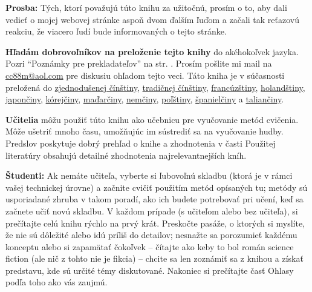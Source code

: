 \cleardoublepage
\pagestyle{fancy}
\fancyhf{}
\fancyfoot[LE,RO]{\thepage}
\renewcommand{\headrulewidth}{0pt}
\renewcommand{\footrulewidth}{0pt}

 \setcounter{page}{1} 
\tableofcontents
\clearpage{\pagestyle{empty}\cleardoublepage}
 \setcounter{page}{1}

\textbf{Prosba:} Tých, ktorí považujú túto knihu za užitočnú, prosím o to, aby dali vedieť o mojej webovej stránke aspoň dvom ďalším ľuďom a začali tak reťazovú reakciu, že viacero ľudí bude informovaných o tejto stránke. 
\medskip

\textbf{Hľadám dobrovoľníkov na preloženie tejto knihy} do akéhokoľvek jazyka. Pozri “Poznámky pre prekladateľov” na str. \pageref{subsec:poznamky-pre-prekladatelov}. Prosím pošlite mi mail na \href{mailto:cc88m@aol.com}{cc88m@aol.com} pre diskusiu ohľadom tejto veci. Táto kniha je v súčasnosti preložená do \href{http://bbs.popiano.org/viewthread.php?tid=192544&amp;extra=page\%3D1}{zjednodušenej čínštiny}, \href{http://www.pianogarden.tw/}{tradičnej čínštiny}, \href{http://www.sinerj.org/~loyer/fopp/}{francúzštiny}, \href{http://www.hansvanbreugel.nl/SnellerPianoStuderen/}{holandštiny}, \href{http://www.pianopractice.org/japanese.pdf}{japončiny}, \href{http://ko.wikisource.org/wiki/Fundamentals_of_piano_practice}{kórejčiny}, \href{http://www.makrai.net/balazs/fopp/contents.php}{maďarčiny}, \href{http://foppde.uteedgar-lins.de/index.html}{nemčiny}, \href{http://pianoart.eu.interiowo.pl/}{poľštiny}, \href{http://www.pianopractice.org/spanish.pdf}{španielčiny} a
\href{http://www.studiarepianoforte.it/}{taliančiny}.
\medskip

\textbf{Učitelia} môžu použiť túto knihu ako učebnicu pre vyučovanie metód cvičenia. Môže ušetriť mnoho času, umožňujúc im sústrediť sa na vyučovanie hudby. Predslov poskytuje dobrý prehľad o knihe a zhodnotenia v časti Použitej literatúry obsahujú detailné zhodnotenia najrelevantnejších kníh.
\medskip
           
\textbf{Študenti:} Ak nemáte učiteľa, vyberte si ľubovoľnú skladbu (ktorá je v rámci vašej technickej úrovne) a začnite cvičiť použitím metód opísaných tu; metódy sú usporiadané zhruba v takom poradí, ako ich budete potrebovať pri učení, keď sa začnete učiť novú skladbu. V každom prípade (s učiteľom alebo bez učiteľa), si prečítajte celú knihu rýchlo na prvý krát. Preskočte pasáže, o ktorých si myslíte, že nie sú dôležité alebo idú príliš do detailov; nesnažte sa porozumieť každému konceptu alebo si zapamätať čokoľvek – čítajte ako keby to bol román science fiction (ale nič z tohto nie je fikcia) – chcite sa len zoznámiť sa z knihou a získať predstavu, kde sú určité témy diskutované. Nakoniec si prečítajte časť Ohlasy podľa toho ako vás zaujmú.

